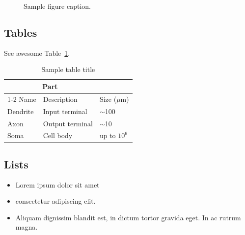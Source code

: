 \documentclass{article}
\begin{document}
\begin{figure}
  \centering
  \fbox{\rule[-.5cm]{4cm}{4cm} \rule[-.5cm]{4cm}{0cm}}
  \caption{Sample figure caption.}
  \label{fig:fig1}
\end{figure}


\subsection{Tables}
\lipsum[12]
See awesome Table~\ref{tab:table}.

\begin{table}
 \caption{Sample table title}
  \centering
  \begin{tabular}{lll}
    \toprule
    \multicolumn{2}{c}{Part}                   \\
    \cmidrule(r){1-2}
    Name     & Description     & Size ($\mu$m) \\
    \midrule
    Dendrite & Input terminal  & $\sim$100     \\
    Axon     & Output terminal & $\sim$10      \\
    Soma     & Cell body       & up to $10^6$  \\
    \bottomrule
  \end{tabular}
  \label{tab:table}
\end{table}

\subsection{Lists}
\begin{itemize}
\item Lorem ipsum dolor sit amet
\item consectetur adipiscing elit.
\item Aliquam dignissim blandit est, in dictum tortor gravida eget. In ac rutrum magna.
\end{itemize}



\end{document}

